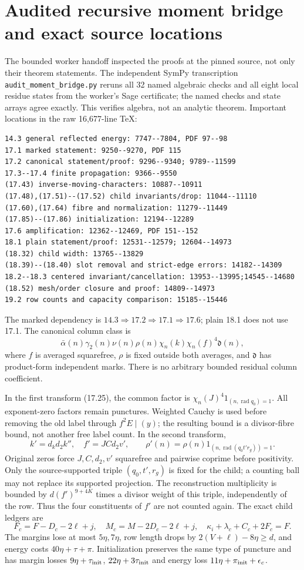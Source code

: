 \documentclass[12pt]{article}
\begin{document}
\section{Audited recursive moment bridge and exact source locations}
The bounded worker handoff inspected the proofs at the pinned source,
not only their theorem statements.  The independent SymPy transcription
\texttt{audit\_moment\_bridge.py} reruns all 32 named algebraic checks
and all eight local residue states from the worker's Sage certificate;
the named checks and state arrays agree exactly.  This verifies algebra,
not an analytic theorem.  Important locations in the raw 16,677-line TeX:
\begin{verbatim}
14.3 general reflected energy: 7747--7804, PDF 97--98
17.1 marked statement: 9250--9270, PDF 115
17.2 canonical statement/proof: 9296--9340; 9789--11599
17.3--17.4 finite propagation: 9366--9550
(17.43) inverse-moving-characters: 10887--10911
(17.48),(17.51)--(17.52) child invariants/drop: 11044--11110
(17.60),(17.64) fibre and normalization: 11279--11449
(17.85)--(17.86) initialization: 12194--12289
17.6 amplification: 12362--12469, PDF 151--152
18.1 plain statement/proof: 12531--12579; 12604--14973
(18.32) child width: 13765--13829
(18.39)--(18.40) slot removal and strict-edge errors: 14182--14309
18.2--18.3 centered invariant/cancellation: 13953--13995;14545--14680
(18.52) mesh/order closure and proof: 14809--14973
19.2 row counts and capacity comparison: 15185--15446
\end{verbatim}

The marked dependency is \(14.3\Rightarrow17.2\Rightarrow17.1
\Rightarrow17.6\); plain 18.1 does not use 17.1.
The canonical column class is
\[
 \bar\alpha(n)\gamma_2(n)\nu(n)\rho(n)
       \chi_n(k)\chi_n(f)^4\mathfrak d(n),
\]
where \(f\) is averaged squarefree, \(\rho\) is fixed outside both
averages, and \(\mathfrak d\) has product-form independent marks.
There is no arbitrary bounded residual column coefficient.

In the first transform (17.25), the common factor is
\(\chi_n(J)^4 1_{(n,\operatorname{rad}q_0)=1}\).
All exponent-zero factors remain punctures.  Weighted Cauchy is
used before removing the old label through \(f^2E\mid(y)\);
the resulting bound is a divisor-fibre bound, not another free label
count.  In the second transform,
\[
 k'=d_kd_2k'',\quad f'=JCd_2v',\qquad
 \rho'(n)=\rho(n)1_{(n,\operatorname{rad}(q_0t'r_g))=1}.
\]
Original zeros force \(J,C,d_2,v'\) squarefree and pairwise coprime
before positivity.  Only the source-supported triple
\((q_0,t',r_g)\) is fixed for the child; a counting ball may not
replace its supported projection.  The reconstruction multiplicity
is bounded by \(d(f')^{9+4K}\) times a divisor weight of this triple,
independently of the row.  Thus the four constituents of \(f'\)
are not counted again.
The exact child ledgers are
\[
 F_c=F-D_c-2\ell+j,\quad M_c=M-2D_c-2\ell+j,\quad
 \kappa_i+\lambda_c+C_c+2F_c=F.
\]
The margins lose at most \(5\eta,7\eta\), row length drops by
\(2(V+\ell)-8\eta\ge d\), and energy costs \(40\eta+\tau+\pi\).
Initialization preserves the same type of puncture and has margin
losses \(9\eta+\tau_{\rm init}\), \(22\eta+3\tau_{\rm init}\)
and energy loss \(11\eta+\pi_{\rm init}+\epsilon_c\).
\end{document}

